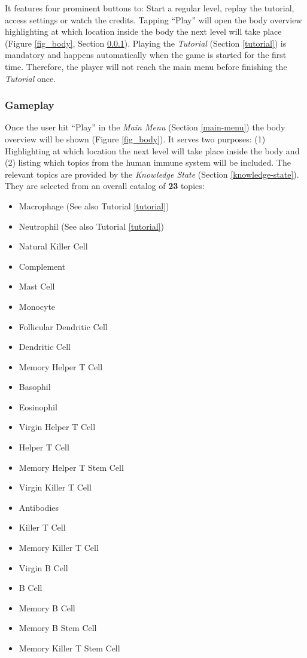 It features four prominent buttons to: Start a regular level, replay the tutorial, access settings or watch the credits. Tapping \enquote{Play} will open the body overview highlighting at which location inside the body the next level will take place (Figure \ref{fig_body}, Section \ref{gameplay}). Playing the \textit{Tutorial} (Section \ref{tutorial}) is mandatory and happens automatically when the game is started for the first time. Therefore, the player will not reach the main menu before finishing the \textit{Tutorial} once.

\subsubsection{Gameplay} \label{gameplay}
Once the user hit \enquote{Play} in the \textit{Main Menu} (Section \ref{main-menu}) the body overview will be shown (Figure \ref{fig_body}). It serves two purposes: (1) Highlighting at which location the next level will take place inside the body and (2) listing which topics from the human immune system will be included. The relevant topics are provided by the \textit{Knowledge State} (Section \ref{knowledge-state}). They are selected from an overall catalog of \textbf{23} topics:

\begin{itemize}
  \item Macrophage (See also Tutorial \ref{tutorial})
  \item Neutrophil (See also Tutorial \ref{tutorial})
  \item Natural Killer Cell
  \item Complement
  \item Mast Cell
  \item Monocyte
  \item Follicular Dendritic Cell
  \item Dendritic Cell
  \item Memory Helper T Cell
  \item Basophil
  \item Eosinophil
  \item Virgin Helper T Cell
  \item Helper T Cell
  \item Memory Helper T Stem Cell
  \item Virgin Killer T Cell
  \item Antibodies
  \item Killer T Cell
  \item Memory Killer T Cell
  \item Virgin B Cell
  \item B Cell
  \item Memory B Cell
  \item Memory B Stem Cell
  \item Memory Killer T Stem Cell
\end{itemize}

